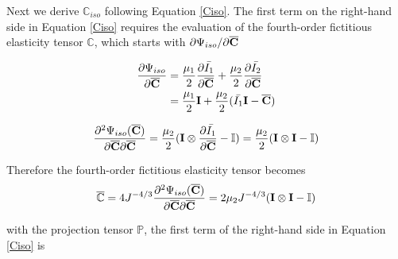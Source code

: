 Next we derive $\mathbb{C}_{iso}$ following Equation \ref{Ciso}. The first term on the right-hand side in Equation \ref{Ciso} requires the evaluation of the fourth-order fictitious elasticity tensor $\mathbb{C}$, which starts with ${\partial{\Psi_{iso}}}/{\partial{\overline{\bold{C}}}}$

\begin{equation}
\begin{split}
\frac{\partial{\Psi_{iso}}}{\partial{\overline{\bold{C}}}} &= \frac{\mu_1}{2}\frac{\partial{\bar{I_1}}}{\partial{\overline{\bold{C}}}} +  \frac{\mu_2}{2}\frac{\partial{\bar{I_2}}}{\partial{\overline{\bold{C}}}} \\
&= \frac{\mu_1}{2}\bold{I} + \frac{\mu_2}{2}(\bar{I_1}\bold{I} - \overline{\bold{C}})
\end{split}
\end{equation}

\begin{equation}
\frac{\partial^2\Psi_{iso}(\overline{\bold{C}})}{\partial\overline{\bold{C}}\partial\overline{\bold{C}}} = 
\frac{\mu_2}{2}(\bold{I} \otimes \frac{\partial{\bar{I_1}}}{\partial{\overline{\bold{C}}}} - \mathbb{I}) = \frac{\mu_2}{2}(\bold{I} \otimes \bold{I} - \mathbb{I})
\end{equation}

Therefore the fourth-order fictitious elasticity tensor becomes
\begin{equation}
\overline{\mathbb{C}} = 4J^{-4/3}\frac{\partial^2\Psi_{iso}(\overline{\bold{C}})}{\partial{\overline{\bold{C}}}{\partial{\overline{\bold{C}}}}} = 2\mu_2{J^{-4/3}}(\bold{I} \otimes \bold{I} - \mathbb{I})
\end{equation}

with the projection tensor $\mathbb{P}$, the first term of the right-hand side in Equation \ref{Ciso} is

